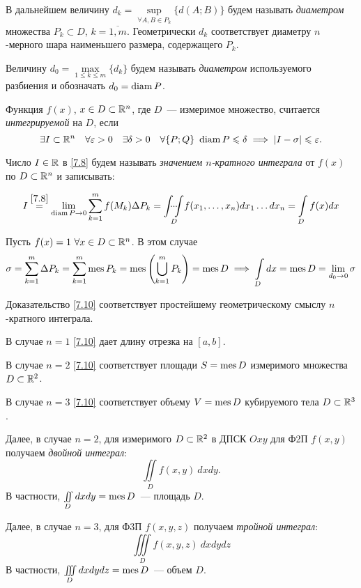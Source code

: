 \documentclass[../../main.tex]{subfiles}
\begin{document}
В дальнейшем величину $d_k = \underset{\forall A, B \in 
P_k}\sup \{d(A; B)\}$
будем называть \emph{диаметром} множества $P_k \subset 
D$, $k = \overline{1, m}$. 
Геометрически $d_k$ соответствует диаметру $n$-мерного шара
наименьшего размера, содержащего $P_k$.

Величину ${d_0 = \underset{1 \le k \le m}\max \{d_k\}}$ 
будем называть \emph{диаметром} используемого разбиения и
обозначать $d_0 = \operatorname{diam} P$.

Функция $f(x)$, $x \in D \subset \mathbb{R}^n$, где $D$~--- измеримое
множество, считается \emph{интегрируемой} на $D$, если
\begin{equation}
\label{7.8}
\exists I \subset \R^n \quad
\forall \varepsilon > 0 \quad \exists \delta > 0 \quad 
\forall \{P; Q\} \ 
\diam P \le \delta \implies \abs{I  - \sigma} \le \eps.
\end{equation}

Число $ I \in \mathbb{R} $ в \eqref{7.8}
будем называть \emph{значением $n$-кратного интеграла} от 
$f(x)$ по $D \subset \mathbb{R}^n$ и записывать:

\begin{equation}
	I \stk{7.8} = \lim_{\diam P\to 0} \sum_{k=1}^m f(M_k) \Delta P_k
	= \underset{D}{\idotsint} f(x_1, \ldots, x_n) d x_1 \ldots dx_n =
	 \int\limits_{D}f(x)dx
\end{equation}


\begin{example}
	Пусть $f(x) = 1\ \forall x \in D \subset \mathbb{R}^n$. В этом случае
	\begin{equation}
	\label{7.10}
	\sigma = \sum\limits_{k = 1}^m\Delta{P_k} = 
	\sum\limits_{k=1}^m \operatorname{mes} P_k =
	\operatorname{mes}\left(\bigcup\limits_{k = 1}^m P_k\right) = \operatorname{mes} D
	\implies \int\limits_D dx = \operatorname{mes} D = \lim\limits_{d_0 \to 0} \sigma
	\end{equation}
	
	Доказательство \eqref{7.10} соответствует 
	простейшему геометрическому смыслу $n$-кратного 
	интеграла.
	
	В случае $n = 1$ \eqref{7.10} дает длину отрезка на $[a, b]$.
	
	В случае $n = 2$ \eqref{7.10} соответствует площади $S = \operatorname{mes} D$ 
	измеримого множества $D \subset \mathbb{R}^2$.
	
	В случае $n = 3$ \eqref{7.10} соответствует объему $V = \operatorname{mes} D$
	кубируемого тела $D \subset \mathbb{R}^3$.
	
	Далее, в случае $n=2$, для измеримого $D \subset \mathbb{R}^2$ в ДПСК 
	$Oxy$ для Ф2П $f(x, y)$ получаем \emph{двойной интеграл}:
	\[
		\iint\limits_D f(x, y)\:dxdy.
	\]
	В частности, $\iint\limits_D dxdy = \operatorname{mes} D$~--- площадь $D$.
	
	Далее, в случае $n=3$, для Ф3П $f(x, y, z)$ получаем 
	\emph{тройной интеграл}:
	\[
	\iiint\limits_D f(x,y,z)\:dxdydz
	\]
	В частности, $\iiint\limits_D dxdydz = \operatorname{mes} D$~--- объем $D$.
\end{example}
\end{document}
